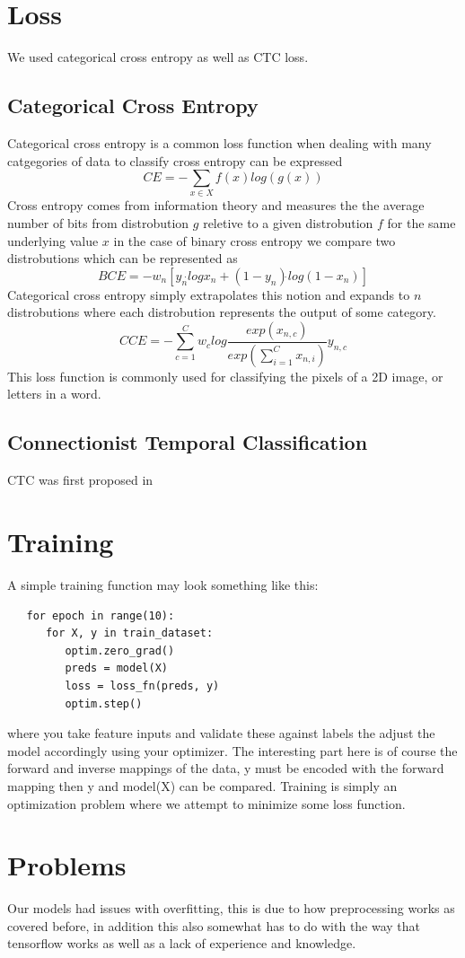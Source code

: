 \documentclass[11pt]{article}
\begin{document}
\section{Loss}
We used categorical cross entropy as well as CTC loss.
\subsection{Categorical Cross Entropy}
Categorical cross entropy is a common loss function when dealing with many catgegories of data to classify cross entropy can be expressed
$$
CE = -\sum_{x\in{}X} f(x)log(g(x))
$$
Cross entropy comes from information theory and measures the the average number of bits from distrobution $g$ reletive to a given distrobution $f$ for the same underlying value $x$ \cite{murphy2012} in the case of binary cross entropy we compare two distrobutions which can be represented as
$$
BCE = -w_n [y_n \dot{} log x_n + (1 - y_n) \dot{} log(1 - x_n)]
$$
Categorical cross entropy simply extrapolates this notion and expands to $n$ distrobutions where each distrobution represents the output of some category.
$$
CCE = -\sum_{c=1}^{C} w_c log \frac{exp(x_{n, c})}{exp(\sum_{i=1}^{C}x_{n,i})} y_{n,c}
$$
This loss function is commonly used for classifying the pixels of a 2D image, or letters in a word.

\subsection{Connectionist Temporal Classification}
CTC was first proposed in \cite{graves2006}

\section{Training}
A simple training function may look something like this:
\begin{verbatim}
   for epoch in range(10):
      for X, y in train_dataset:
         optim.zero_grad()
         preds = model(X)
         loss = loss_fn(preds, y)
         optim.step()
\end{verbatim}
where you take feature inputs and validate these against labels the adjust the model accordingly using your optimizer. The interesting part here is of course the forward and inverse mappings of the data, y must be encoded with the forward mapping then y and model(X) can be compared. Training is simply an optimization problem where we attempt to minimize some loss function.

\section{Problems}
Our models had issues with overfitting, this is due to how preprocessing works as covered before, in addition this also somewhat has to do with the way that tensorflow works as well as a lack of experience and knowledge.
\end{document}
